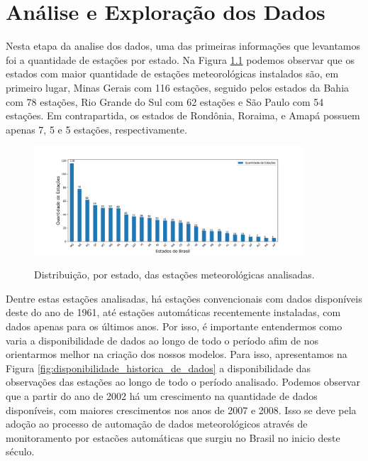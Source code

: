\chapter{Análise e Exploração dos Dados}

Nesta etapa da analise dos dados, uma das primeiras informações que levantamos foi a quantidade de estações por estado. Na Figura \ref{fig:estacoes_por_estado} podemos observar que os estados com maior quantidade de estações meteorológicas instalados são, em primeiro lugar, Minas Gerais com 116 estações, seguido pelos estados da Bahia com 78 estações,  Rio Grande do Sul com 62 estações e São Paulo com 54 estações. Em contrapartida, os estados de Rondônia,  Roraima, e Amapá possuem apenas 7, 5 e 5 estações, respectivamente.  

\begin{figure}[H]
    \centering
    \caption{Distribuição, por estado, das estações meteorológicas analisadas.}
    \includegraphics[width=0.9\textwidth]{figuras/estacoes_por_estado.png}
    \label{fig:estacoes_por_estado}
\end{figure}

Dentre estas estações analisadas, há estações convencionais com dados disponíveis deste do ano de 1961, até estações automáticas recentemente instaladas, com dados apenas para os últimos anos. Por isso, é importante entendermos como varia a disponibilidade de dados ao longo de todo o período afim de nos orientarmos melhor na criação dos nossos modelos. Para isso, apresentamos na Figura \ref{fig:disponibilidade_historica_de_dados} a disponibilidade das observações das estações ao longo de todo o período analisado. Podemos observar que a partir do ano de 2002 há um crescimento na quantidade de dados disponíveis, com maiores crescimentos nos anos de 2007 e 2008. Isso se deve pela adoção ao processo de automação de dados meteorológicos através de monitoramento por estacões automáticas que surgiu no Brasil no inicio deste século.  

